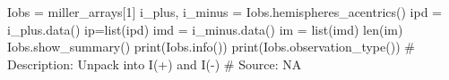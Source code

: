 Iobs = miller_arrays[1]
i_plus, i_minus = Iobs.hemispheres_acentrics()
ipd = i_plus.data()
ip=list(ipd)
imd = i_minus.data()
im = list(imd)
len(im)
Iobs.show_summary()
print(Iobs.info())
print(Iobs.observation_type())
# Description:  Unpack into I(+) and I(-)
# Source:  NA

